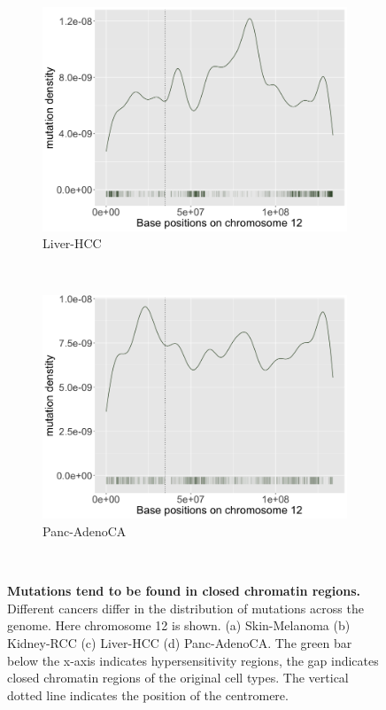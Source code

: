 \begin{figure}[htbp]
    \begin{subfigure}{.5\textwidth}
    \includegraphics[width=\linewidth,height=0.7\textwidth]{graphics/mutdistribution_Liver-HCC.png}
    \caption{Liver-HCC}
    \label{fig:density_liver}
    \end{subfigure}
    ~
    \begin{subfigure}{.5\textwidth}
    \includegraphics[width=\linewidth,height=0.7\textwidth]{graphics/mutdistribution_Panc-AdenoCA.png}
    \caption{Panc-AdenoCA}
    \label{fig:density_panc_adenoca}
    \end{subfigure} \\
    
    \caption{\textbf{Mutations tend to be found in closed chromatin regions.} Different cancers differ in the distribution of mutations across the genome. Here chromosome 12 is shown. (a) Skin-Melanoma (b) Kidney-RCC (c) Liver-HCC (d) Panc-AdenoCA. The green bar below the x-axis indicates hypersensitivity regions, the gap indicates closed chromatin regions of the original cell types. The vertical dotted line indicates the position of the centromere.}
    \label{fig:mutation_density}
\end{figure}